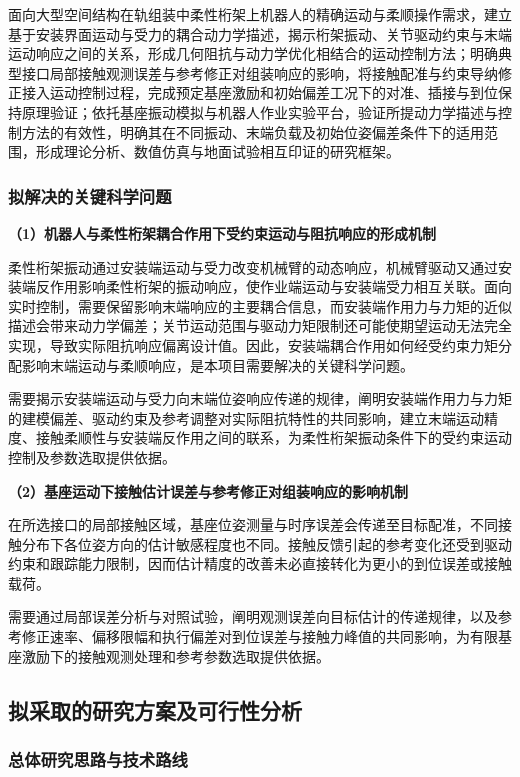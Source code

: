 \documentclass[UTF8,a4paper,zihao=-4,fontset=fandol]{ctexart}
\newcommand{\topic}[1]{\par\addvspace{0.5em}\noindent\textbf{#1}\par\nobreak}
\begin{document}
面向大型空间结构在轨组装中柔性桁架上机器人的精确运动与柔顺操作需求，建立基于安装界面运动与受力的耦合动力学描述，揭示桁架振动、关节驱动约束与末端运动响应之间的关系，形成几何阻抗与动力学优化相结合的运动控制方法；明确典型接口局部接触观测误差与参考修正对组装响应的影响，将接触配准与约束导纳修正接入运动控制过程，完成预定基座激励和初始偏差工况下的对准、插接与到位保持原理验证；依托基座振动模拟与机器人作业实验平台，验证所提动力学描述与控制方法的有效性，明确其在不同振动、末端负载及初始位姿偏差条件下的适用范围，形成理论分析、数值仿真与地面试验相互印证的研究框架。

\subsubsection{拟解决的关键科学问题}

\topic{（1）机器人与柔性桁架耦合作用下受约束运动与阻抗响应的形成机制}

柔性桁架振动通过安装端运动与受力改变机械臂的动态响应，机械臂驱动又通过安装端反作用影响柔性桁架的振动响应，使作业端运动与安装端受力相互关联。面向实时控制，需要保留影响末端响应的主要耦合信息，而安装端作用力与力矩的近似描述会带来动力学偏差；关节运动范围与驱动力矩限制还可能使期望运动无法完全实现，导致实际阻抗响应偏离设计值。因此，安装端耦合作用如何经受约束力矩分配影响末端运动与柔顺响应，是本项目需要解决的关键科学问题。

需要揭示安装端运动与受力向末端位姿响应传递的规律，阐明安装端作用力与力矩的建模偏差、驱动约束及参考调整对实际阻抗特性的共同影响，建立末端运动精度、接触柔顺性与安装端反作用之间的联系，为柔性桁架振动条件下的受约束运动控制及参数选取提供依据。

\topic{（2）基座运动下接触估计误差与参考修正对组装响应的影响机制}

在所选接口的局部接触区域，基座位姿测量与时序误差会传递至目标配准，不同接触分布下各位姿方向的估计敏感程度也不同。接触反馈引起的参考变化还受到驱动约束和跟踪能力限制，因而估计精度的改善未必直接转化为更小的到位误差或接触载荷。

需要通过局部误差分析与对照试验，阐明观测误差向目标估计的传递规律，以及参考修正速率、偏移限幅和执行偏差对到位误差与接触力峰值的共同影响，为有限基座激励下的接触观测处理和参考参数选取提供依据。

\subsection{拟采取的研究方案及可行性分析}

\subsubsection{总体研究思路与技术路线}
\end{document}
